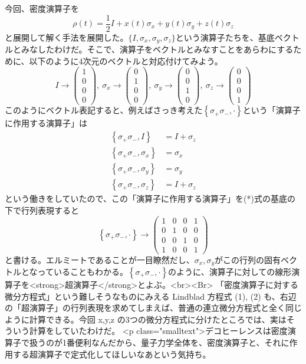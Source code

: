 今回、密度演算子を
\[\rho(t) = \frac{1}{2}I + x(t)\sigma_x + y(t)\sigma_y + z(t)\sigma_z\tag{2}\]
と展開して解く手法を展開した。\(\{I,\sigma_x,\sigma_y,\sigma_z\}\)という演算子たちを、基底ベクトルとみなしたわけだ。そこで、演算子をベクトルとみなすことをあらわにするために、以下のように4次元のベクトルと対応付けてみよう。
\[I \to \left(\begin{array}{c} 1\\0\\0\\0\end{array}\right),~\sigma_x \to \left(\begin{array}{c} 0\\1\\0\\0\end{array}\right),~\sigma_y \to \left(\begin{array}{c} 0\\0\\1\\0\end{array}\right),~\sigma_z \to \left(\begin{array}{c} 0\\0\\0\\1\end{array}\right) \tag{*}\]
このようにベクトル表記すると、例えばさっき考えた\(\left\{\sigma_+ \sigma_- , \cdot\right\}\)という「演算子に作用する演算子」は
\begin{align}
\left\{\sigma_+ \sigma_- , I\right\} &= I+\sigma_z \\
\left\{\sigma_+ \sigma_- , \sigma_x\right\} &= \sigma_x \\
\left\{\sigma_+ \sigma_- , \sigma_y\right\} &= \sigma_y \\
\left\{\sigma_+ \sigma_- , \sigma_z\right\} &= I+\sigma_z				
\end{align}
という働きをしていたので、この「演算子に作用する演算子」を(*)式の基底の下で行列表現すると
\[\left\{\sigma_+ \sigma_- , \cdot\right\} \to  \left(\begin{array}{cccc} 1&0&0&1\\0&1&0&0\\0&0&1&0\\1&0&0&1\end{array}\right)\]
と書ける。エルミートであることが一目瞭然だし、\(\sigma_x,\sigma_y\)がこの行列の固有ベクトルとなっていることもわかる。\(\left\{\sigma_+ \sigma_- , \cdot\right\}\)のように、演算子に対しての線形演算子を<strong>超演算子</strong>とよぶ。<br><Br>
「密度演算子に対する微分方程式」という難しそうなものにみえる Lindblad 方程式 (1), (2) も、右辺の「超演算子」の行列表現を求めてしまえば、普通の連立微分方程式と全く同じように計算できる。今回 x,y,z の3つの微分方程式に分けたところでは、実はそういう計算をしていたわけだ。
<p class="smalltext">デコヒーレンスは密度演算子で扱うのが1番便利なんだから、量子力学全体を、密度演算子と、それに作用する超演算子で定式化してほしいなあという気持ち。



